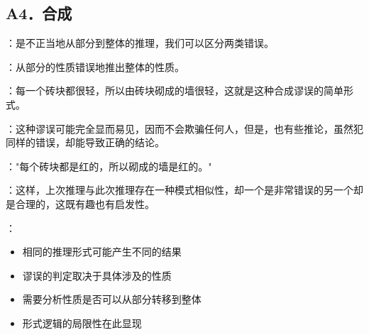 \subsection{A4．合成}

\begin{theorembox}[title=合成谬误的定义]
：是不正当地从部分到整体的推理，我们可以区分两类错误。

：从部分的性质错误地推出整体的性质。

：每一个砖块都很轻，所以由砖块砌成的墙很轻，这就是这种合成谬误的简单形式。

：这种谬误可能完全显而易见，因而不会欺骗任何人，但是，也有些推论，虽然犯同样的错误，却能导致正确的结论。

："每个砖块都是红的，所以砌成的墙是红的。"

：这样，上次推理与此次推理存在一种模式相似性，却一个是非常错误的另一个却是合理的，这既有趣也有启发性。

：
\begin{itemize}
  \item 相同的推理形式可能产生不同的结果
  \item 谬误的判定取决于具体涉及的性质
  \item 需要分析性质是否可以从部分转移到整体
  \item 形式逻辑的局限性在此显现
\end{itemize}
\end{theorembox}

